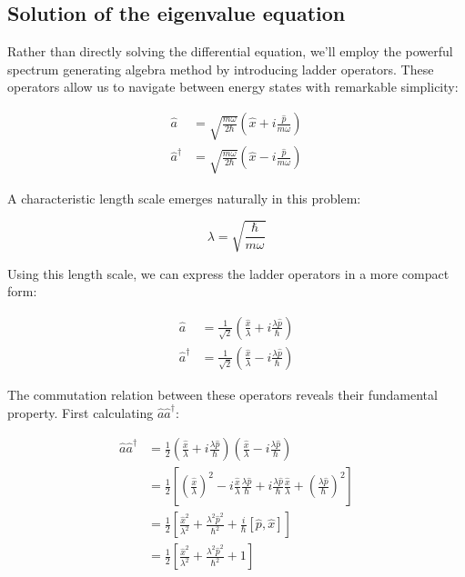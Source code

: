 \documentclass[italian]{HKNdocument}
\begin{document}
\subsection{Solution of the eigenvalue equation}

Rather than directly solving the differential equation, we'll employ the powerful spectrum generating algebra method by introducing ladder operators. These operators allow us to navigate between energy states with remarkable simplicity:

\begin{align}
\hat{a} &= \sqrt{\frac{m\omega}{2\hbar}}\left(\hat{x} + i\frac{\hat{p}}{m\omega}\right) \label{eq:5.5} \\
\hat{a}^\dagger &= \sqrt{\frac{m\omega}{2\hbar}}\left(\hat{x} - i\frac{\hat{p}}{m\omega}\right)
\end{align}

A characteristic length scale emerges naturally in this problem:

\begin{equation}
\lambda = \sqrt{\frac{\hbar}{m\omega}} \label{eq:5.6}
\end{equation}

Using this length scale, we can express the ladder operators in a more compact form:

\begin{align}
\hat{a} &= \frac{1}{\sqrt{2}}\left(\frac{\hat{x}}{\lambda} + i\frac{\lambda\hat{p}}{\hbar}\right) \label{eq:5.7} \\
\hat{a}^\dagger &= \frac{1}{\sqrt{2}}\left(\frac{\hat{x}}{\lambda} - i\frac{\lambda\hat{p}}{\hbar}\right)
\end{align}

The commutation relation between these operators reveals their fundamental property. First calculating $\hat{a}\hat{a}^\dagger$:

\begin{align}
\hat{a}\hat{a}^\dagger &= \frac{1}{2}\left(\frac{\hat{x}}{\lambda} + i\frac{\lambda\hat{p}}{\hbar}\right)\left(\frac{\hat{x}}{\lambda} - i\frac{\lambda\hat{p}}{\hbar}\right) \\
&= \frac{1}{2}\left[\left(\frac{\hat{x}}{\lambda}\right)^2 - i\frac{\hat{x}}{\lambda}\frac{\lambda\hat{p}}{\hbar} + i\frac{\lambda\hat{p}}{\hbar}\frac{\hat{x}}{\lambda} + \left(\frac{\lambda\hat{p}}{\hbar}\right)^2\right] \\
&= \frac{1}{2}\left[\frac{\hat{x}^2}{\lambda^2} + \frac{\lambda^2\hat{p}^2}{\hbar^2} + \frac{i}{\hbar}[\hat{p},\hat{x}]\right] \label{eq:5.8} \\
&= \frac{1}{2}\left[\frac{\hat{x}^2}{\lambda^2} + \frac{\lambda^2\hat{p}^2}{\hbar^2} + 1\right]
\end{align}
\end{document}
